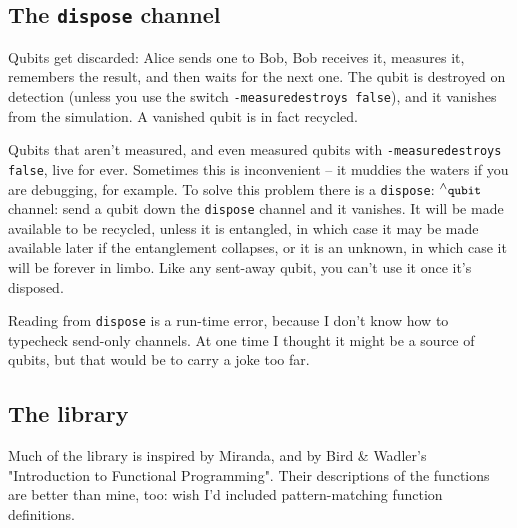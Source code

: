 \documentclass[11pt,a4paper]{article}
\newcommand{\verbtt}[1]{\texttt{\small{}#1}}
\newcommand{\caret}[0]{\ensuremath{{}^{\wedge}}}
\begin{document}
\subsection{The \verbtt{dispose} channel}

Qubits get discarded: Alice sends one to Bob, Bob receives it, measures it, remembers the result, and then waits for the next one. The qubit is destroyed on detection (unless you use the switch \verbtt{-measuredestroys false}), and it vanishes from the simulation. A vanished qubit is in fact recycled.

Qubits that aren't measured, and even measured qubits with \verbtt{-measuredestroys false}, live for ever. Sometimes this is inconvenient -- it muddies the waters if you are debugging, for example. To solve this problem there is a \verbtt{dispose}: $\caret{}\verbtt{qubit}$ channel: send a qubit down the \verbtt{dispose} channel and it vanishes. It will be made available to be recycled, unless it is entangled, in which case it may be made available later if the entanglement collapses, or it is an unknown, in which case it will be forever in limbo. Like any sent-away qubit, you can't use it once it's disposed.

Reading from \verbtt{dispose} is a run-time error, because I don't know how to typecheck send-only channels. At one time I thought it might be a source of qubits, but that would be to carry a joke too far.

\subsection{The library}

\newenvironment{explain}{\list{}{}\item\relax}{\endlist}
\newcommand{\libitem}[2]{\hspace{10pt}\verbtt{#1}\vspace{-\topsep}\vspace{-\parskip}\begin{explain}#2\vspace{-\parskip}\end{explain}}
\newcommand{\libitemS}[1]{\libitem{#1}{\mbox{}\vspace{-\topsep}\vspace{-\topsep}}}
Much of the library is inspired by Miranda, and by Bird \& Wadler's "Introduction to Functional Programming". Their descriptions of the functions are better than mine, too: wish I'd included pattern-matching function definitions.
\end{document}
